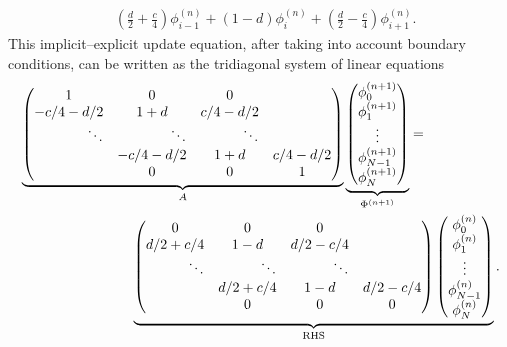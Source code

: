 \documentclass[reqno, 12pt]{amsart}
\begin{document}
\begin{itemize}
\begin{align*}
            & \left(\frac{d}{2} + \frac{c}{4}\right)\phi_{i-1}^{(n)} + \left(1 - d\right)\phi_i^{(n)} + \left(\frac{d}{2} - \frac{c}{4}\right)\phi_{i + 1}^{(n)}.
        \end{align*}
        This implicit--explicit update equation, after taking into account boundary conditions, can be written as the tridiagonal system of linear equations
        \begin{align*}
            &\underbrace{
            \begin{pmatrix}
                1 & 0 & 0 \\
                -c/4 - d/2 & 1 + d & c/4 - d/2 \\
                \hfill \ddots & \hfill \ddots & \hfill \ddots \\
                & -c/4 - d/2 & 1 + d & c/4 - d/2 \\
                & 0 & 0 & 1
            \end{pmatrix}}_{A}
            \underbrace{
            \begin{pmatrix}
                \phi_0^{(n+1)} \\
                \phi_1^{(n+1)} \\ 
                \vdots \\
                \phi_{N-1}^{(n+1)} \\
                \phi_{N}^{(n+1)}
            \end{pmatrix}}_{\Phi^{(n+1)}}
                =\\
            &\qquad\qquad\qquad\qquad\underbrace{
            \begin{pmatrix}
                0 & 0 & 0 \\ 
                d/2 + c/4 & 1 - d & d/2 - c/4 \\
                \hfill \ddots & \hfill \ddots & \hfill \ddots \\
                & d/2 + c/4 & 1 - d & d/2 - c/4 \\
                & 0 & 0 & 0
            \end{pmatrix}
            \begin{pmatrix}
                \phi_0^{(n)} \\ 
                \phi_1^{(n)} \\ 
                \vdots \\ 
                \phi_{N-1}^{(n)} \\ 
                \phi_N^{(n)}
            \end{pmatrix}}_{\text{RHS}}.
        \end{align*}
    \end{itemize}
\end{document}
